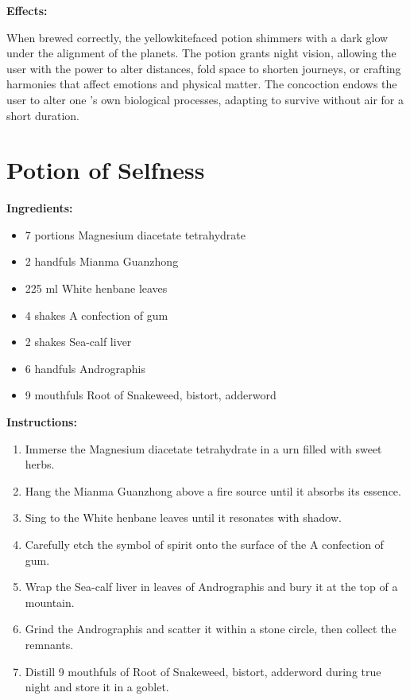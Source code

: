\documentclass{article}
\begin{document}
\textbf{Effects:}

When brewed correctly, the yellowkitefaced potion shimmers with a dark glow under the alignment of the planets. The potion grants night vision, allowing the user with the power to alter distances, fold space to shorten journeys, or crafting harmonies that affect emotions and physical matter. The concoction endows the user to alter one 's own biological processes, adapting to survive without air for a short duration.

\newpage
\section*{Potion of Selfness}

\textbf{Ingredients:}

\begin{itemize}
  \item 7 portions Magnesium diacetate tetrahydrate
  \item 2 handfuls Mianma Guanzhong
  \item 225 ml White henbane leaves
  \item 4 shakes A confection of gum
  \item 2 shakes Sea-calf liver
  \item 6 handfuls Andrographis
  \item 9 mouthfuls Root of Snakeweed, bistort, adderword
\end{itemize}

\textbf{Instructions:}

\begin{enumerate}
  \item Immerse the Magnesium diacetate tetrahydrate in a urn filled with sweet herbs.
  \item Hang the Mianma Guanzhong above a fire source until it absorbs its essence.
  \item Sing to the White henbane leaves until it resonates with shadow.
  \item Carefully etch the symbol of spirit onto the surface of the A confection of gum.
  \item Wrap the Sea-calf liver in leaves of Andrographis and bury it at the top of a mountain.
  \item Grind the Andrographis and scatter it within a stone circle, then collect the remnants.
  \item Distill 9 mouthfuls of Root of Snakeweed, bistort, adderword during true night and store it in a goblet.
\end{enumerate}
\end{document}
